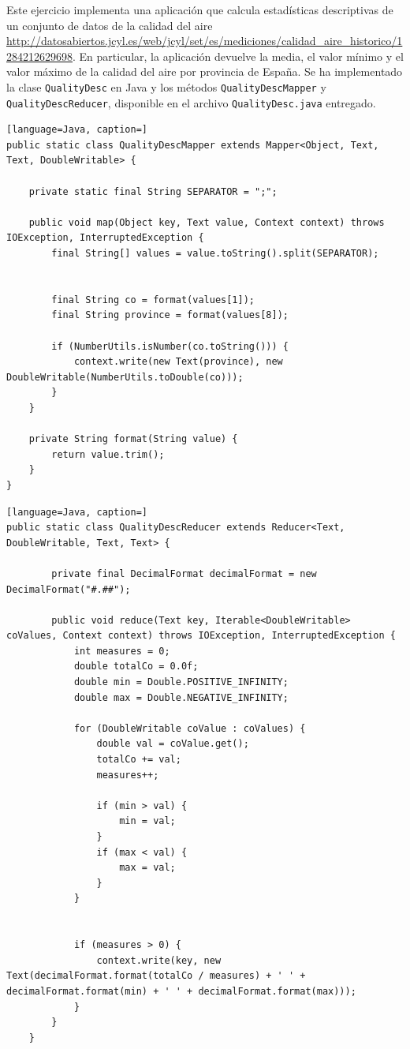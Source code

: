 \documentclass[10pt,swedish, openany]{book}
\begin{document}
Este ejercicio implementa una aplicación que calcula estadísticas descriptivas de un conjunto de datos de la calidad del aire \url{http://datosabiertos.jcyl.es/web/jcyl/set/es/mediciones/calidad_aire_historico/1284212629698}. En particular, la aplicación devuelve la media, el valor mínimo y el valor máximo de la calidad del aire por provincia de España. Se ha implementado la clase \texttt{QualityDesc} en Java y los métodos \texttt{QualityDescMapper} y \texttt{QualityDescReducer}, disponible en el archivo \texttt{QualityDesc.java} entregado. 
\begin{lstlisting}[language=Java, caption=]
public static class QualityDescMapper extends Mapper<Object, Text, Text, DoubleWritable> {

	private static final String SEPARATOR = ";";

	public void map(Object key, Text value, Context context) throws IOException, InterruptedException {
		final String[] values = value.toString().split(SEPARATOR);


		final String co = format(values[1]);
		final String province = format(values[8]);

		if (NumberUtils.isNumber(co.toString())) {
			context.write(new Text(province), new DoubleWritable(NumberUtils.toDouble(co)));
		}
	}

	private String format(String value) {
		return value.trim();
	}
}
\end{lstlisting}
\begin{lstlisting}[language=Java, caption=]
public static class QualityDescReducer extends Reducer<Text, DoubleWritable, Text, Text> {

		private final DecimalFormat decimalFormat = new DecimalFormat("#.##");

		public void reduce(Text key, Iterable<DoubleWritable> coValues, Context context) throws IOException, InterruptedException {
			int measures = 0;
			double totalCo = 0.0f;
			double min = Double.POSITIVE_INFINITY;
			double max = Double.NEGATIVE_INFINITY;

			for (DoubleWritable coValue : coValues) {
				double val = coValue.get();
				totalCo += val;
				measures++;

				if (min > val) {
					min = val;
				}
				if (max < val) {
					max = val;				
				}
			}
			

			if (measures > 0) {
				context.write(key, new Text(decimalFormat.format(totalCo / measures) + ' ' + decimalFormat.format(min) + ' ' + decimalFormat.format(max)));
			}
		}
	}
\end{lstlisting}
\end{document}
